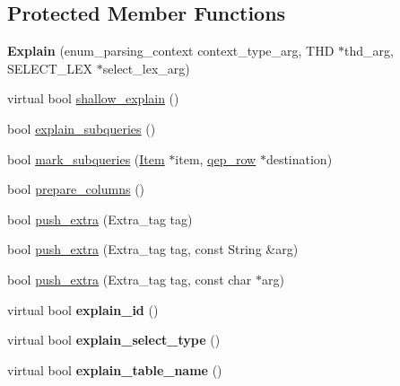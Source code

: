 \subsection*{Protected Member Functions}
\begin{DoxyCompactItemize}
\item 
\mbox{\label{classExplain_a43e68458cdac188cdc9294c37266b1f1}} 
{\bfseries Explain} (enum\+\_\+parsing\+\_\+context context\+\_\+type\+\_\+arg, T\+HD $\ast$thd\+\_\+arg, S\+E\+L\+E\+C\+T\+\_\+\+L\+EX $\ast$select\+\_\+lex\+\_\+arg)
\item 
virtual bool \mbox{\hyperlink{classExplain_a2b5b074864b25d4bb669047dbcae8abb}{shallow\+\_\+explain}} ()
\item 
bool \mbox{\hyperlink{classExplain_ade38da9640240663e08eb144a2253e55}{explain\+\_\+subqueries}} ()
\item 
bool \mbox{\hyperlink{classExplain_a1a3d27add9e8faaf3e126fbcb4bcaa4f}{mark\+\_\+subqueries}} (\mbox{\hyperlink{classItem}{Item}} $\ast$item, \mbox{\hyperlink{classqep__row}{qep\+\_\+row}} $\ast$destination)
\item 
bool \mbox{\hyperlink{classExplain_a040295c73eb7c5ca8c25e60afe529dcd}{prepare\+\_\+columns}} ()
\item 
bool \mbox{\hyperlink{classExplain_a52e25da1e96991443d9fda548293bebf}{push\+\_\+extra}} (Extra\+\_\+tag tag)
\item 
bool \mbox{\hyperlink{classExplain_a08fe671cc2e7de54a18a3aa886af2ac6}{push\+\_\+extra}} (Extra\+\_\+tag tag, const String \&arg)
\item 
bool \mbox{\hyperlink{classExplain_ab163b209b693ae6da003f8b3fbcb0e3d}{push\+\_\+extra}} (Extra\+\_\+tag tag, const char $\ast$arg)
\item 
\mbox{\label{classExplain_a946af11069481ce64be2cf400dd4c6de}} 
virtual bool {\bfseries explain\+\_\+id} ()
\item 
\mbox{\label{classExplain_adf8a55be59f83025c5e51b94926e434b}} 
virtual bool {\bfseries explain\+\_\+select\+\_\+type} ()
\item 
\mbox{\label{classExplain_aca1264b5de63f9cd155d5b64ec63d654}} 
virtual bool {\bfseries explain\+\_\+table\+\_\+name} ()
\item 
\mbox{\label{classExplain_a04a76d8e2a16d178f45c01645624305b}} 

\end{DoxyCompactItemize}
